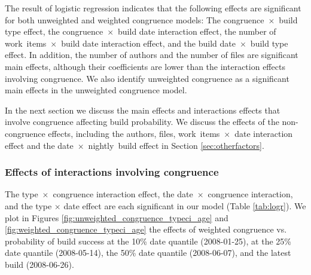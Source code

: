 \documentclass[12pt,oneside]{book}
\begin{document}


The result of logistic regression indicates that the following effects are significant for both unweighted and weighted congruence models: The congruence~$\times$~build type effect, the congruence~$\times$~build date interaction effect, the number of work~items~$\times$~build date interaction effect, and the build date~$\times$~build type effect. In addition, the number of authors and the number of files are significant main effects, although their coefficients are lower than the interaction effects involving congruence. We also identify unweighted congruence as a significant main effects in the unweighted congruence model.

In the next section we discuss the main effects and interactions effects that involve congruence affecting build probability. We discuss the effects of the non-congruence effects, including the authors, files, work~items~$\times$~date interaction effect and the date~$\times$~nightly~build effect in Section \ref{sec:otherfactors}.

\subsubsection{Effects of interactions involving congruence}
\label{sec:congruenceinteractions}

The type~$\times$~congruence interaction effect, the date~$\times$~congruence interaction, and the type $\times$ date effect are each significant in our model (Table \ref{tab:logr}). We plot in Figures \ref{fig:unweighted_congruence_typeci_age} and \ref{fig:weighted_congruence_typeci_age} the effects of weighted congruence vs. probability of build success at the 10\% date quantile (2008-01-25), at the 25\% date quantile (2008-05-14), the 50\% date quantile (2008-06-07), and the latest build (2008-06-26).
\end{document}
